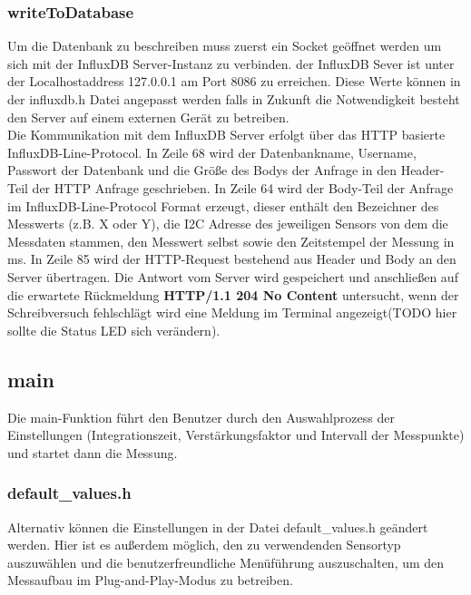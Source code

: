 \subsubsection{writeToDatabase}
Um die Datenbank zu beschreiben muss zuerst ein Socket geöffnet werden um sich mit der InfluxDB Server-Instanz  zu verbinden.
der InfluxDB Sever ist unter der Localhostaddress 127.0.0.1 am Port 8086 zu erreichen.
	Diese Werte können in der influxdb.h Datei angepasst werden falls in Zukunft die Notwendigkeit besteht den Server auf einem externen Gerät zu betreiben.\\
Die Kommunikation mit dem InfluxDB Server erfolgt über das HTTP basierte InfluxDB-Line-Protocol.
In Zeile 68 wird der Datenbankname, Username,  Passwort der Datenbank und die Größe des Bodys der Anfrage in den Header-Teil der HTTP Anfrage geschrieben.
In Zeile 64 wird der Body-Teil der Anfrage im InfluxDB-Line-Protocol Format erzeugt, dieser enthält den Bezeichner des Messwerts (z.B. X oder Y), die I2C Adresse des jeweiligen Sensors von dem die Messdaten stammen, den Messwert selbst sowie den Zeitstempel der Messung in ms.	
In Zeile 85 wird der HTTP-Request bestehend aus Header und Body an den Server übertragen.
Die Antwort vom Server wird gespeichert und anschließen auf die erwartete Rückmeldung \textbf{HTTP/1.1 204 No Content } untersucht, wenn der Schreibversuch fehlschlägt wird eine Meldung im Terminal angezeigt(TODO hier sollte die Status LED sich verändern).


\subsection{main}
Die main-Funktion führt den Benutzer durch den Auswahlprozess der Einstellungen (Integrationszeit, Verstärkungsfaktor und Intervall der Messpunkte) und startet dann die Messung.\\
\subsubsection{default\_values.h}
\noindent Alternativ können die Einstellungen in der Datei default\_values.h geändert werden. Hier ist es außerdem möglich, den zu verwendenden Sensortyp auszuwählen und die benutzerfreundliche Menüführung auszuschalten, um den Messaufbau im Plug-and-Play-Modus zu betreiben.\\





